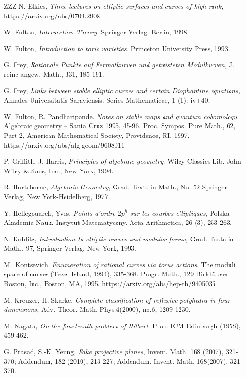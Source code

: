 \documentclass[11pt]{article}
\numberwithin{equation}{section}
\numberwithin{footnote}{section}
\begin{document}
\begin{thebibliography}{ZZZ}
 N. Elkies, \textit{Three lectures on elliptic surfaces and curves of high rank,}
https://arxiv.org/abs/0709.2908

 W. Fulton, \textit{Intersection Theory.} Springer-Verlag, Berlin, 1998.

 W. Fulton, \textit{Introduction to toric varieties.} Princeton University Press, 1993.

 G. Frey, \textit{Rationale Punkte auf Fermatkurven und getwisteten Modulkurven,} J. reine angew. Math., 331, 185-191.

 G. Frey, \textit{Links between stable elliptic curves and certain Diophantine equations,} Annales Universitatis Saraviensis. Series Mathematicae, 1 (1): iv+40.

 W. Fulton, R. Pandharipande, \textit{
Notes on stable maps and quantum cohomology.} Algebraic geometry -- Santa Cruz 1995, 45-96.
Proc. Sympos. Pure Math., 62, Part 2, American Mathematical Society, Providence, RI, 1997.
https://arxiv.org/abs/alg-geom/9608011

 P. Griffith, J. Harris,
\textit{Principles of algebraic geometry.}
Wiley Classics Lib.
John Wiley \& Sons, Inc., New York, 1994.


 R. Hartshorne, \textit{Algebraic Geometry}, Grad. Texts in Math., No. 52
Springer-Verlag, New York-Heidelberg, 1977.

Y. Hellegouarch, Yves, \textit{Points d'ordre $2p^h$ sur les courbes elliptiques,} Polska Akademia Nauk. Instytut Matematyczny. Acta Arithmetica, 26 (3), 253-263. 

 N. Koblitz,
\textit{Introduction to elliptic curves and modular forms,} Grad. Texts in Math., 97, 
Springer-Verlag, New York, 1993.

M.~Kontsevich, \textit{Enumeration of rational curves via torus actions.} The moduli space of curves (Texel Island, 1994), 335-368. Progr. Math., 129
Birkh\"auser Boston, Inc., Boston, MA, 1995.
https://arxiv.org/abs/hep-th/9405035

 M. Kreuzer, H. Skarke, 
\textit{Complete classification of reflexive polyhedra in four dimensions,}
Adv. Theor. Math. Phys.4(2000), no.6, 1209-1230.

 M. Nagata, \textit{On the fourteenth problem of Hilbert.} Proc. ICM Edinburgh (1958), 459-462.

 G. Prasad, S.-K. Yeung, \textit{Fake projective planes}, Invent. Math. 168
(2007), 321-370; Addendum, 182
(2010), 213-227; Addendum.
Invent. Math. 168(2007), 321-370.


\end{thebibliography}
\end{document}
